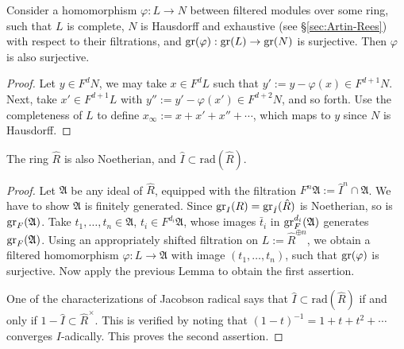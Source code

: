 \begin{lemma}\label{prop:gr-surjective}
	Consider a homomorphism $\varphi: L \to N$ between filtered modules over some ring, such that $L$ is complete, $N$ is Hausdorff and exhaustive (see \S\ref{sec:Artin-Rees}) with respect to their filtrations, and $\operatorname{gr}(\varphi): \operatorname{gr}(L) \to \operatorname{gr}(N)$ is surjective. Then $\varphi$ is also surjective.
\end{lemma}
\begin{proof}
	Let $y \in F^d N$, we may take $x \in F^d L$ such that $y' := y- \varphi(x) \in F^{d+1} N$. Next, take $x' \in F^{d+1} L$ with $y'' := y' -  \varphi(x') \in F^{d+2} N$, and so forth. Use the completeness of $L$ to define $x_\infty := x + x' + x'' + \cdots$, which maps to $y$ since $N$ is Hausdorff.
\end{proof}

\begin{proposition}\label{prop:completion-rad}
	The ring $\hat{R}$ is also Noetherian, and $\hat{I} \subset \mathrm{rad}(\hat{R})$.
\end{proposition}
\begin{proof}
	Let $\mathfrak{A}$ be any ideal of $\hat{R}$, equipped with the filtration $F^n \mathfrak{A} := \hat{I}^n \cap \mathfrak{A}$. We have to show $\mathfrak{A}$ is finitely generated. Since $\operatorname{gr}_I(R) = \operatorname{gr}_{\hat{I}}(\hat{R})$ is Noetherian, so is $\operatorname{gr}_F(\mathfrak{A})$. Take $t_1, \ldots, t_n \in \mathfrak{A}$, $t_i \in F^{d_i} \mathfrak{A}$, whose images $\bar{t}_i$ in $\operatorname{gr}^{d_i}_F(\mathfrak{A})$ generates $\operatorname{gr}_F(\mathfrak{A})$. Using an appropriately shifted filtration on $L := \hat{R}^{\oplus n}$, we obtain a filtered homomorphism $\varphi: L \to  \mathfrak{A}$ with image $(t_1, \ldots, t_n)$, such that $\operatorname{gr}(\varphi)$ is surjective. Now apply the previous Lemma to obtain the first assertion.
	
	One of the characterizations of Jacobson radical says that $\hat{I} \subset \mathrm{rad}(\hat{R})$ if and only if $1 - \hat{I} \subset \hat{R}^\times$. This is verified by noting that $(1-t)^{-1} = 1+t+t^2+ \cdots$ converges $I$-adically. This proves the second assertion.
\end{proof}


